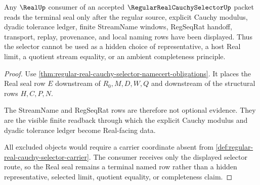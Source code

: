 \begin{theorem}
\label{thm:regular-real-cauchy-selector-real-seal}
Any $\RealUp$ consumer of an accepted $\RegularRealCauchySelectorUp$ packet reads the terminal seal only after the regular source, explicit Cauchy modulus, dyadic tolerance ledger, finite StreamName windows, RegSeqRat handoff, transport, replay, provenance, and local naming rows have been displayed. Thus the selector cannot be used as a hidden choice of representative, a host Real limit, a quotient stream equality, or an ambient completeness principle.
\end{theorem}
\begin{proof}
Use \autoref{thm:regular-real-cauchy-selector-namecert-obligations}. It places the Real seal row $E$ downstream of $R_0,M,D,W,Q$ and downstream of the structural rows $H,C,P,N$.

The StreamName and RegSeqRat rows are therefore not optional evidence. They are the visible finite readback through which the explicit Cauchy modulus and dyadic tolerance ledger become Real-facing data.

All excluded objects would require a carrier coordinate absent from \autoref{def:regular-real-cauchy-selector-carrier}. The consumer receives only the displayed selector route, so the Real seal remains a terminal named row rather than a hidden representative, selected limit, quotient equality, or completeness claim.
\end{proof}





